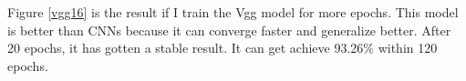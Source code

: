 \documentclass{article}
\begin{document}
Figure \ref{vgg16} is the result if I train the Vgg model for more epochs. This model is better than CNNs because it can converge faster and generalize better. After 20 epochs, it has gotten a stable result. It can get achieve 93.26\% within 120 epochs.

\begin{figure}[!h]
\quad
{}
\end{figure}
\end{document}
